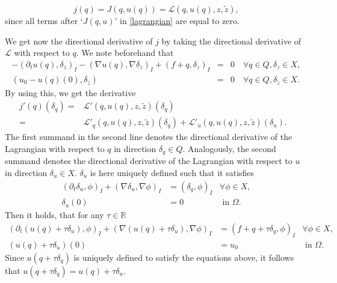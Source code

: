 \begin{displaymath}
j(q)=J(q, u(q))=\mathcal{L}(q,u(q),z,\tilde{z}),
\end{displaymath}
since all terms after `$J(q,u)$' in \eqref{lagrangian} are equal to zero.

We get now the directional derivative of $j$ by taking the directional derivative of $\mathcal{L}$ with respect to $q$. We note beforehand that 
\begin{eqnarray*}
-(\partial_tu(q),\delta_z)_I-(\nabla u(q), \nabla \delta_z)_I+(f+q, \delta_z)_I&=&0\quad\forall q\in Q, \delta_z\in X,\\
(u_0-u(q)(0), \delta_{\tilde{z}})&=&0\quad\forall q\in Q, \delta_{\tilde{z}}\in X.
\end{eqnarray*}
By using this, we get the derivative
\begin{equation}
\label{LagrangianDerivative}
\begin{aligned}
j'(q)(\delta_q)=&\mathcal{L}'(q,u(q),z,\tilde{z})(\delta_q)&\\
=&\mathcal{L}'_q(q, u(q), z, \tilde{z})(\delta_q)+\mathcal{L}'_u(q,u(q),z,\tilde{z})(\delta_u).&
\end{aligned}
\end{equation}
The first summand in the second line denotes the directional derivative of the Lagrangian with respect to $q$ in direction $\delta_q\in Q$. Analogously, the second summand denotes the directional derivative of the Lagrangian with respect to $u$ in direction $\delta_u\in X$. $\delta_u$ is here uniquely defined such that it satisfies
\begin{equation*}
\begin{aligned}
	(\partial_t\delta_u,\phi)_I+(\nabla \delta_u,\nabla\phi)_I&=(\delta_q,\phi)_I&\forall\phi\in X,\\
	\delta_u(0)&=0&\text{ in }\Omega.
\end{aligned}
\end{equation*}
Then it holds, that for any $\tau\in\mathbb{R}$
\begin{equation*}
\begin{aligned}
	(\partial_t(u(q)+\tau\delta_u),\phi)_I+(\nabla (u(q)+\tau\delta_u),\nabla\phi)_I&=(f+q+\tau\delta_q,\phi)_I&\forall\phi\in X,\\
	(u(q)+\tau\delta_u)(0)&=u_0&\text{ in }\Omega.
\end{aligned}
\end{equation*}
Since $u(q+\tau\delta_q)$ is uniquely defined to satisfy the equations above, it follows that $u(q+\tau\delta_q)=u(q)+\tau\delta_u$.

